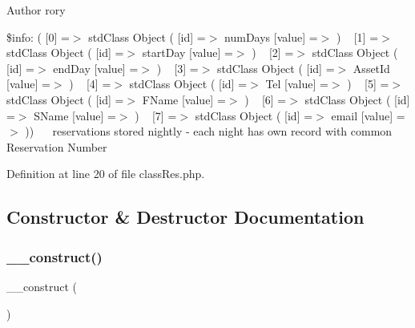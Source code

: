 \begin{DoxyAuthor}{Author}
rory
\end{DoxyAuthor}
\$info\+: ( \mbox{[}0\mbox{]} =$>$ std\+Class Object ( \mbox{[}id\mbox{]} =$>$ num\+Days \mbox{[}value\mbox{]} =$>$ ) ~\newline
 \mbox{[}1\mbox{]} =$>$ std\+Class Object ( \mbox{[}id\mbox{]} =$>$ start\+Day \mbox{[}value\mbox{]} =$>$ ) ~\newline
 \mbox{[}2\mbox{]} =$>$ std\+Class Object ( \mbox{[}id\mbox{]} =$>$ end\+Day \mbox{[}value\mbox{]} =$>$ ) ~\newline
 \mbox{[}3\mbox{]} =$>$ std\+Class Object ( \mbox{[}id\mbox{]} =$>$ Asset\+Id \mbox{[}value\mbox{]} =$>$ ) ~\newline
 \mbox{[}4\mbox{]} =$>$ std\+Class Object ( \mbox{[}id\mbox{]} =$>$ Tel \mbox{[}value\mbox{]} =$>$ ) ~\newline
 \mbox{[}5\mbox{]} =$>$ std\+Class Object ( \mbox{[}id\mbox{]} =$>$ F\+Name \mbox{[}value\mbox{]} =$>$ ) ~\newline
 \mbox{[}6\mbox{]} =$>$ std\+Class Object ( \mbox{[}id\mbox{]} =$>$ S\+Name \mbox{[}value\mbox{]} =$>$ ) ~\newline
 \mbox{[}7\mbox{]} =$>$ std\+Class Object ( \mbox{[}id\mbox{]} =$>$ email \mbox{[}value\mbox{]} =$>$ ))~\newline
 ~\newline
 reservations stored nightly -\/ each night has own record with common Reservation Number~\newline
 

Definition at line 20 of file class\+Res.\+php.



\subsection{Constructor \& Destructor Documentation}
\mbox{\label{classclass_res_a095c5d389db211932136b53f25f39685}} 
\subsubsection{\texorpdfstring{\+\_\+\+\_\+construct()}{\_\_construct()}}
{\footnotesize\ttfamily \+\_\+\+\_\+construct (\begin{DoxyParamCaption}{ }\end{DoxyParamCaption})}



